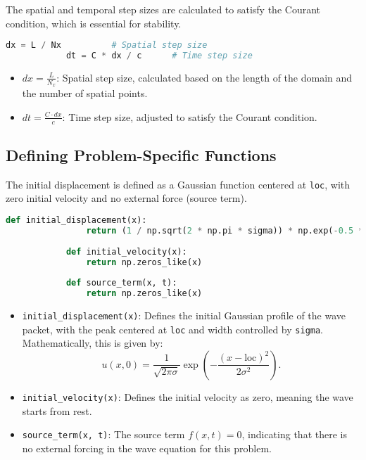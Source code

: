 \documentclass{article}
\begin{document}
		 The spatial and temporal step sizes are calculated to satisfy the Courant condition, which is essential for stability.
		 
		 \begin{lstlisting}[language=Python]
		 	dx = L / Nx          # Spatial step size
		 	dt = C * dx / c      # Time step size
		 \end{lstlisting}
		 
		 \begin{itemize}
		 	\item \( dx = \frac{L}{N_x} \): Spatial step size, calculated based on the length of the domain and the number of spatial points.
		 	\item \( dt = \frac{C \cdot dx}{c} \): Time step size, adjusted to satisfy the Courant condition.
		 \end{itemize}
		 
		 \subsection{Defining Problem-Specific Functions}
		 
		 The initial displacement is defined as a Gaussian function centered at \texttt{loc}, with zero initial velocity and no external force (source term).
		 
		 \begin{lstlisting}[language=Python]
		 	def initial_displacement(x):
		 		return (1 / np.sqrt(2 * np.pi * sigma)) * np.exp(-0.5 * ((x - loc) / sigma) ** 2)
		 	
		 	def initial_velocity(x):
		 		return np.zeros_like(x)
		 	
		 	def source_term(x, t):
		 		return np.zeros_like(x)
		 \end{lstlisting}
		 
		 \begin{itemize}
		 	\item \texttt{initial\_displacement(x)}: Defines the initial Gaussian profile of the wave packet, with the peak centered at \texttt{loc} and width controlled by \texttt{sigma}. Mathematically, this is given by:
		 	\[
		 	u(x, 0) = \frac{1}{\sqrt{2 \pi \sigma}} \exp\left(-\frac{(x - \text{loc})^2}{2 \sigma^2}\right).
		 	\]
		 	\item \texttt{initial\_velocity(x)}: Defines the initial velocity as zero, meaning the wave starts from rest.
		 	\item \texttt{source\_term(x, t)}: The source term \( f(x, t) = 0 \), indicating that there is no external forcing in the wave equation for this problem.
		 \end{itemize}
		 
\end{document}
